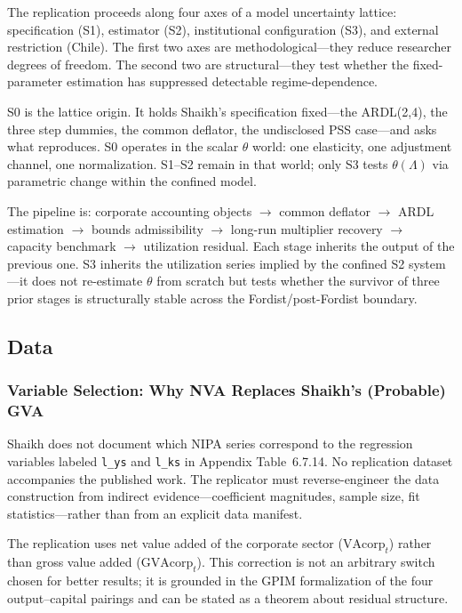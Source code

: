 \documentclass[11pt,a4paper]{article}
\begin{document}
The replication proceeds along four axes of a model uncertainty lattice: specification (S1), estimator (S2), institutional configuration (S3), and external restriction (Chile). The first two axes are methodological---they reduce researcher degrees of freedom. The second two are structural---they test whether the fixed-parameter estimation has suppressed detectable regime-dependence.

S0 is the lattice origin. It holds Shaikh's specification fixed---the ARDL(2,4), the three step dummies, the common deflator, the undisclosed PSS case---and asks what reproduces. S0 operates in the scalar $\theta$ world: one elasticity, one adjustment channel, one normalization. S1--S2 remain in that world; only S3 tests $\theta(\Lambda)$ via parametric change within the confined model.

The pipeline is: corporate accounting objects $\to$ common deflator $\to$ ARDL estimation $\to$ bounds admissibility $\to$ long-run multiplier recovery $\to$ capacity benchmark $\to$ utilization residual. Each stage inherits the output of the previous one. S3 inherits the utilization series implied by the confined S2 system---it does not re-estimate $\theta$ from scratch but tests whether the survivor of three prior stages is structurally stable across the Fordist/post-Fordist boundary.



\subsection{Data}
\label{subsec:data}

\subsubsection{Variable Selection: Why NVA Replaces Shaikh's (Probable) GVA}

Shaikh does not document which NIPA series correspond to the regression variables labeled \texttt{l\_ys} and \texttt{l\_ks} in Appendix Table~6.7.14. No replication dataset accompanies the published work. The replicator must reverse-engineer the data construction from indirect evidence---coefficient magnitudes, sample size, fit statistics---rather than from an explicit data manifest.

The replication uses net value added of the corporate sector ($\text{VAcorp}_t$) rather than gross value added ($\text{GVAcorp}_t$). This correction is not an arbitrary switch chosen for better results; it is grounded in the GPIM formalization of the four output--capital pairings and can be stated as a theorem about residual structure.
\end{document}
